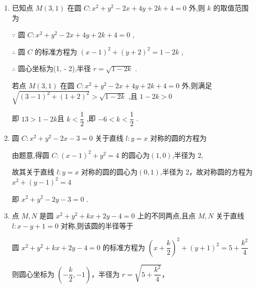 \begin{enumerate}
\begin{enumerate}
\begin{jieda}
            当 $a = \dfrac{6}{5}$ 时, ${r}_{\min } = \dfrac{3\sqrt{5}}{5}$ .
            
            故所求圆的方程为 $\left( {x - \dfrac{6}{5}}\right)  + \left( {y - \dfrac{3}{5}}\right)  = \dfrac{9}{5}$ .
        \end{jieda}
        \item 已知点 $M\left( {3,1}\right)$ 在圆 $C : {x}^{2} + {y}^{2} - {2x} + {4y} + {2k} + 4 = 0$ 外,则 $k$ 的取值范围为
        \begin{jieda}
            $\because$ 圆 $C : {x}^{2} + {y}^{2} - {2x} + {4y} + {2k} + 4 = 0$ ,
            
            $\therefore$ 圆 $C$ 的标准方程为 ${\left( x - 1\right) }^{2} + {\left( y + 2\right) }^{2} = 1 - {2k}$ ,
            
            $\therefore$ 圆心坐标为(1, - 2),半径 $r = \sqrt{1 - {2k}}$ .
            
            若点 $M\left( {3,1}\right)$ 在圆 $C : {x}^{2} + {y}^{2} - {2x} + {4y} + {2k} + 4 = 0$ 外,则满足 $\sqrt{{\left( 3 - 1\right) }^{2} + {\left( 1 + 2\right) }^{2}} > \sqrt{1 - {2k}}$ ,且 $1 - {2k} > 0$ 
            
            即 ${13} > 1 - {2k}$且 $k < \dfrac{1}{2}$ ,即 $- 6 < k < \dfrac{1}{2}$ .
        \end{jieda}
        \item 圆 $C : {x}^{2} + {y}^{2} - {2x} - 3 = 0$ 关于直线 $l : y = x$ 对称的圆的方程为
        \begin{jieda}
            由题意,得圆 $C : {\left( x - 1\right) }^{2} + {y}^{2} = 4$ 的圆心为$(1,0)$,半径为 2,
            
            故其关于直线 $l : y = x$ 对称的圆的圆心为$(0,1)$,半径为 2，故对称圆的方程为 ${x}^{2} + {\left( y - 1\right) }^{2} = 4$
            
            即 ${x}^{2} + {y}^{2} - {2y} - 3 = 0$ .
        \end{jieda}
        \item 点 $M,N$ 是圆 ${x}^{2} + {y}^{2} + {kx} + {2y} - 4 = 0$ 上的不同两点,且点 $M,N$ 关于直线 $l : x - y + 1 = 0$ 对称,则该圆的半径等于
        \begin{jieda}
            圆 ${x}^{2} + {y}^{2} + {kx} + {2y} - 4 = 0$ 的标准方程为 ${\left( x + \dfrac{k}{2}\right) }^{2} + {\left( y + 1\right) }^{2} = 5 + \dfrac{{k}^{2}}{4}$
            
            则圆心坐标为 $\left( {-\dfrac{k}{2}, - 1}\right)$，半径为 $r = \sqrt{5 + \dfrac{{k}^{2}}{4}}$，
            

\end{jieda}
\end{enumerate}
\end{enumerate}
